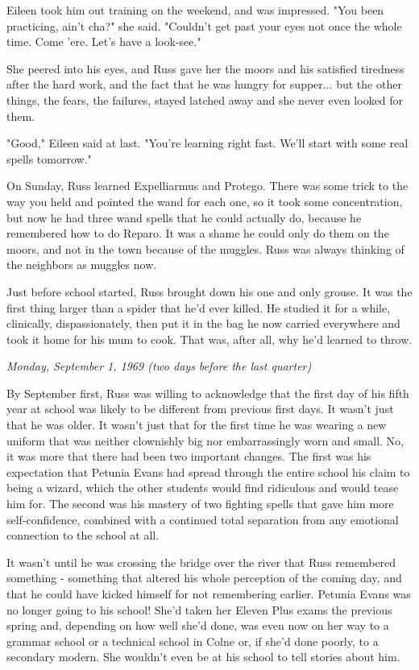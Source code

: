 \documentclass[a4paper,11pt]{article}
\begin{document}
Eileen took him out training on the weekend, and was impressed. "You been practicing, ain't cha?" she said. "Couldn't get past your eyes not once the whole time. Come 'ere. Let's have a look-see."

She peered into his eyes, and Russ gave her the moors and his satisfied tiredness after the hard work, and the fact that he was hungry for supper... but the other things, the fears, the failures, stayed latched away and she never even looked for them.

"Good," Eileen said at last. "You're learning right fast. We'll start with some real spells tomorrow."

On Sunday, Russ learned Expelliarmus and Protego. There was some trick to the way you held and pointed the wand for each one, so it took some concentration, but now he had three wand spells that he could actually do, because he remembered how to do Reparo. It was a shame he could only do them on the moors, and not in the town because of the muggles. Russ was always thinking of the neighbors as muggles now.

Just before school started, Russ brought down his one and only grouse. It was the first thing larger than a spider that he'd ever killed. He studied it for a while, clinically, dispassionately, then put it in the bag he now carried everywhere and took it home for his mum to cook. That was, after all, why he'd learned to throw.

\emph{Monday, September 1, 1969 (two days before the last quarter)}

By September first, Russ was willing to acknowledge that the first day of his fifth year at school was likely to be different from previous first days. It wasn't just that he was older. It wasn't just that for the first time he was wearing a new uniform that was neither clownishly big nor embarrassingly worn and small. No, it was more that there had been two important changes. The first was his expectation that Petunia Evans had spread through the entire school his claim to being a wizard, which the other students would find ridiculous and would tease him for. The second was his mastery of two fighting spells that gave him more self-confidence, combined with a continued total separation from any emotional connection to the school at all.

It wasn't until he was crossing the bridge over the river that Russ remembered something - something that altered his whole perception of the coming day, and that he could have kicked himself for not remembering earlier. Petunia Evans was no longer going to his school! She'd taken her Eleven Plus exams the previous spring and, depending on how well she'd done, was even now on her way to a grammar school or a technical school in Colne or, if she'd done poorly, to a secondary modern. She wouldn't even be at his school to tell stories about him.
\end{document}
